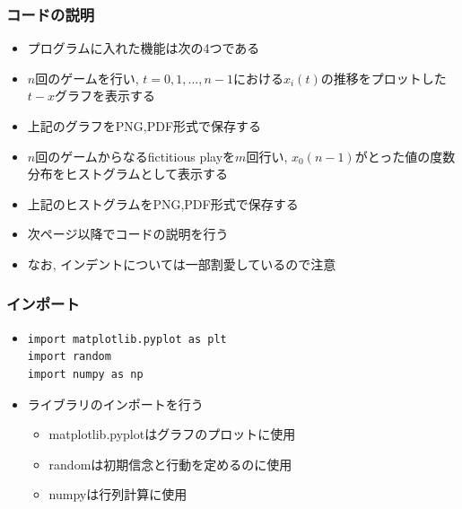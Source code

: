 \documentclass[dvipdfmx,fleqn,handout]{beamer}
\begin{document}
\begin{frame}[fragile]   %
\frametitle{コードの説明}
\begin{itemize}\setlength{\parskip}{0.5em}

\item
プログラムに入れた機能は次の4つである\pause
\item
$n$回のゲームを行い, $t=0,1,\dots,n-1$における$x_i(t)$の推移をプロットした$t-x$グラフを表示する\pause
\item
上記のグラフをPNG,PDF形式で保存する\pause
\item
$n$回のゲームからなるfictitious playを$m$回行い, $x_0(n-1)$がとった値の度数分布をヒストグラムとして表示する\pause
\item
上記のヒストグラムをPNG,PDF形式で保存する\pause
\item
次ページ以降でコードの説明を行う\pause
\item
なお, インデントについては一部割愛しているので注意
\end{itemize}
\end{frame}

\begin{frame}[fragile]   %
\frametitle{インポート}
\begin{itemize}\setlength{\parskip}{0.5em}

\item
\footnotesize
\begin{verbatim}
import matplotlib.pyplot as plt
import random
import numpy as np
\end{verbatim}
\pause
\normalsize
\item
ライブラリのインポートを行う\pause
\begin{itemize}\setlength{\parskip}{0.5em}
\item
matplotlib.pyplotはグラフのプロットに使用　\pause

\item
randomは初期信念と行動を定めるのに使用　\pause

\item
numpyは行列計算に使用
\end{itemize}

\end{itemize}
\end{frame}
\end{document}
